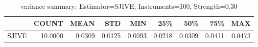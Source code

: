 \begin{table}[ht]
\centering
\caption{variance summary: Estimator=SJIVE, Instruments=100, Strength=0.30}
\begin{tabular}{lrrrrrrrr}
\toprule
 & COUNT & MEAN & STD & MIN & 25\% & 50\% & 75\% & MAX \\
\midrule
SJIVE & 10.0000 & 0.0309 & 0.0125 & 0.0093 & 0.0218 & 0.0309 & 0.0411 & 0.0473 \\
\bottomrule
\end{tabular}
\end{table}

